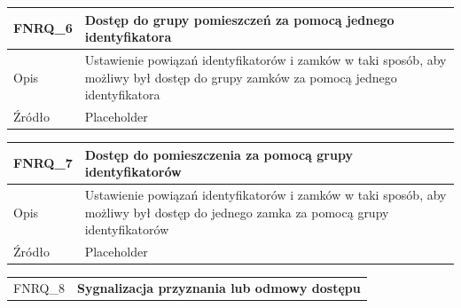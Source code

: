 \begin{table}[h!]
\begin{subtable}[c]{\textwidth}
\begin{tabular}{|p{2cm}|p{12cm}|}
                    \hline
                \end{tabular}
                \label{tbl:fnrq5}
                \vspace{10mm}           
            \end{subtable}
            \begin{subtable}[c]{\textwidth}
                \centering
                 \begin{tabular}{|p{2cm}|p{12cm}|}
                    \hline FNRQ\_6      & \textbf{Dostęp do grupy pomieszczeń za pomocą jednego identyfikatora}  \\
                    \hline \cellcolor[gray]{0.8} Opis         & Ustawienie powiązań identyfikatorów i zamków w taki sposób, aby możliwy był dostęp do grupy zamków za pomocą jednego identyfikatora \\
                    \hline \cellcolor[gray]{0.8} Źródło       & Placeholder    \\
                    \hline
                \end{tabular}
                \label{tbl:fnrq6}
                \vspace{10mm}           
            \end{subtable}
        \quad%
            \begin{subtable}[c]{\textwidth}
                \centering
                 \begin{tabular}{|p{2cm}|p{12cm}|}
                    \hline FNRQ\_7      & \textbf{Dostęp do pomieszczenia za pomocą grupy identyfikatorów}  \\
                    \hline \cellcolor[gray]{0.8} Opis         & Ustawienie powiązań identyfikatorów i zamków w taki sposób, aby możliwy był dostęp do jednego zamka za pomocą grupy identyfikatorów \\
                    \hline \cellcolor[gray]{0.8} Źródło       & Placeholder    \\
                    \hline
                \end{tabular}
                \label{tbl:fnrq7}
                \vspace{10mm}           
            \end{subtable}
        \quad%
            \begin{subtable}[c]{\textwidth}
                \centering
                 \begin{tabular}{|p{2cm}|p{12cm}|}
                    \hline FNRQ\_8      & \textbf{Sygnalizacja przyznania lub odmowy dostępu}  \\

\end{tabular}
\end{subtable}
\end{table}
